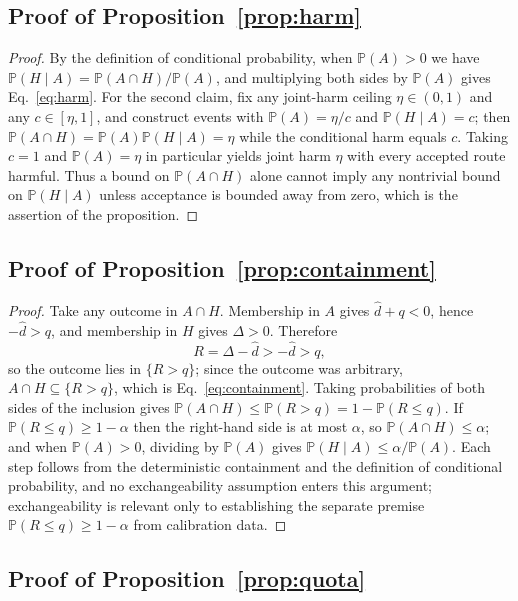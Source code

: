 \documentclass[10pt,twocolumn]{article}
\newcommand{\Pp}{\mathbb{P}}
\begin{document}
\subsection{Proof of Proposition~\ref{prop:harm}}
\label{app:proof-harm}

\begin{proof}
By the definition of conditional probability, when $\Pp(A)>0$ we have
$\Pp(H\mid A)=\Pp(A\cap H)/\Pp(A)$, and multiplying both sides by $\Pp(A)$ gives
Eq.~\eqref{eq:harm}.  For the second claim, fix any joint-harm ceiling
$\eta\in(0,1)$ and any $c\in[\eta,1]$, and construct events with $\Pp(A)=\eta/c$
and $\Pp(H\mid A)=c$; then $\Pp(A\cap H)=\Pp(A)\Pp(H\mid A)=\eta$ while the
conditional harm equals $c$.  Taking $c=1$ and $\Pp(A)=\eta$ in particular yields
joint harm $\eta$ with every accepted route harmful.  Thus a bound on
$\Pp(A\cap H)$ alone cannot imply any nontrivial bound on $\Pp(H\mid A)$ unless
acceptance is bounded away from zero, which is the assertion of the proposition.
\end{proof}

\subsection{Proof of Proposition~\ref{prop:containment}}
\label{app:proof-containment}

\begin{proof}
Take any outcome in $A\cap H$.  Membership in $A$ gives $\widehat d+q<0$, hence
$-\widehat d>q$, and membership in $H$ gives $\Delta>0$.  Therefore
\[
 R=\Delta-\widehat d>-\widehat d>q ,
\]
so the outcome lies in $\{R>q\}$; since the outcome was arbitrary,
$A\cap H\subseteq\{R>q\}$, which is Eq.~\eqref{eq:containment}.  Taking
probabilities of both sides of the inclusion gives
$\Pp(A\cap H)\le\Pp(R>q)=1-\Pp(R\le q)$.  If $\Pp(R\le q)\ge1-\alpha$ then the
right-hand side is at most $\alpha$, so $\Pp(A\cap H)\le\alpha$; and when
$\Pp(A)>0$, dividing by $\Pp(A)$ gives $\Pp(H\mid A)\le\alpha/\Pp(A)$.  Each step
follows from the deterministic containment and the definition of conditional
probability, and no exchangeability assumption enters this argument;
exchangeability is relevant only to establishing the separate premise
$\Pp(R\le q)\ge1-\alpha$ from calibration data.
\end{proof}

\subsection{Proof of Proposition~\ref{prop:quota}}
\label{app:proof-quota}
\end{document}
